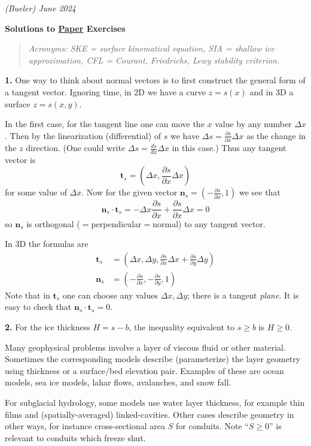 \documentclass[12pt]{amsart}
\newcommand{\bn}{\mathbf{n}}
\newcommand{\bt}{\mathbf{t}}
\newcommand{\prob}[1]{\bigskip\noindent\textbf{#1.}\quad }
\begin{document}
\scriptsize \hfill \emph{(Bueler) June 2024}
\normalsize\medskip

\Large\centerline{\textbf{Solutions to \underline{Paper} Exercises}}

\normalsize
\medskip
\begin{quote}
\emph{Acronyms: SKE = surface kinematical equation, SIA = shallow ice approximation, CFL = Courant, Friedrichs, Lewy stability criterion.}
\end{quote}

\prob{1}  One way to think about normal vectors is to first construct the general form of a tangent vector.  Ignoring time, in 2D we have a curve $z=s(x)$ and in 3D a surface $z=s(x,y)$.

In the first case, for the tangent line one can move the $x$ value by any number $\Delta x$.  Then by the linearization (differential) of $s$ we have $\Delta s= \frac{\partial s}{\partial x} \Delta x$ as the change in the $z$ direction.  (One could write $\Delta s= \frac{ds}{dx} \Delta x$ in this case.)  Thus any tangent vector is
	$$\bt_s = \left(\Delta x, \frac{\partial s}{\partial x} \Delta x\right)$$
for some value of $\Delta x$.  Now for the given vector $\bn_s = (-\frac{\partial s}{\partial x},1)$ we see that
	$$\bn_s \cdot \bt_s = -\Delta x \frac{\partial s}{\partial x} + \frac{\partial s}{\partial x} \Delta x = 0$$
so $\bn_s$ is orthogonal ($=$perpendicular$=$normal) to any tangent vector.

In 3D the formulas are
\begin{align*}
\bt_s &= \left(\Delta x, \Delta y, \frac{\partial s}{\partial x} \Delta x + \frac{\partial s}{\partial y} \Delta y\right) \\
\bn_s &= \left(-\frac{\partial s}{\partial x},-\frac{\partial s}{\partial y},1\right)
\end{align*}
Note that in $\bt_s$ one can choose any values $\Delta x,\Delta y$; there is a tangent \emph{plane}.  It is easy to check that $\bn_s \cdot \bt_s = 0$.


\prob{2}  For the ice thickness $H=s-b$, the inequality equivalent to $s\ge b$ is $H\ge 0$.

Many geophysical problems involve a layer of viscous fluid or other material.  Sometimes the corresponding models describe (parameterize) the layer geometry using thickness or a surface/bed elevation pair.  Examples of these are ocean models, sea ice models, lahar flows, avalanches, and snow fall.

For subglacial hydrology, some models use water layer thickness, for example thin films and (spatially-averaged) linked-cavities.  Other cases describe geometry in other ways, for instance cross-sectional area $S$ for conduits.  Note ``$S\ge 0$'' is relevant to conduits which freeze shut.
\end{document}
